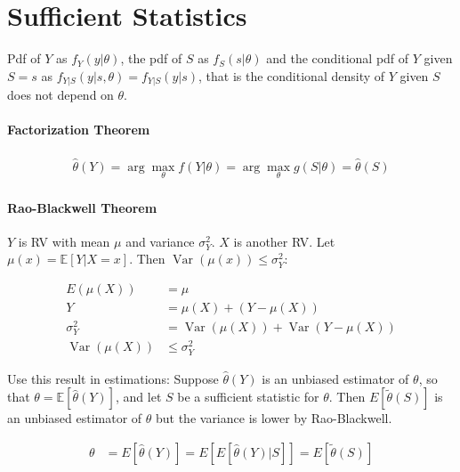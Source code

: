 \section{Sufficient Statistics}

Pdf of $Y$ as $f_Y(y | \theta)$, the pdf of $S$ as $f_S(s | \theta)$ and the conditional pdf of $Y$ given $S=s$ as $f_{Y | S}(y| s, \theta)=f_{Y| S}(y| s)$, that is the conditional density of $Y$ given $S$ does not depend on $\theta$.

\paragraph{Factorization Theorem}

\begin{align*}
    \hat{\theta}(Y)=\arg \max _\theta f(Y | \theta)=\arg \max _\theta g(S | \theta)=\hat{\theta}(S)
\end{align*}

\paragraph{Rao-Blackwell Theorem}

$Y$ is RV with mean $\mu$ and variance $\sigma_Y^2$. $X$ is another RV. Let $\mu(x)=\mathbb{E}[Y| X=x]$. Then $\operatorname{Var}(\mu(x))\leq\sigma_Y^2$:

\begin{align*}
    E (\mu(X))&=\mu \\
    Y&=\mu(X)+(Y-\mu(X)) \\
    \sigma_Y^2&=\operatorname{Var}(\mu(X))+\operatorname{Var}(Y-\mu(X)) \\
    \operatorname{Var}(\mu(X)) &\leq \sigma_Y^2
\end{align*}

Use this result in estimations: 
Suppose $\hat{\theta}(Y)$ is an unbiased estimator of $\theta$, so that $\theta=\mathbb{E}[\hat{\theta}(Y)]$, and let $S$ be a sufficient statistic for $\theta$. Then $E [\tilde{\theta}(S)]$ is an unbiased estimator of $\theta$ but the variance is lower by Rao-Blackwell.

\begin{align*}
    \theta&= E [\hat{\theta}(Y)]= E [ E [\hat{\theta}(Y) | S]]= E [\tilde{\theta}(S)]
\end{align*}

